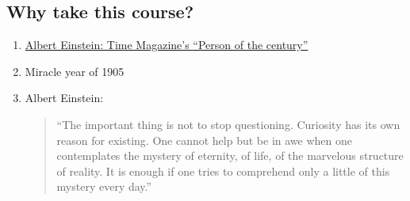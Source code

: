 \documentclass[pagesize,headsepline,10pt,parskip=half]{scrreprt}
\begin{document}
      \subsection{Why take this course?}
        \begin{enumerate}
          \item \href{http://content.time.com/time/magazine/article/0,9171,993017,00.html?iid=sr-link1}{Albert Einstein: Time Magazine’s “Person of the century”}
          \item Miracle year of 1905
          \item Albert Einstein:
            \begin{quote}
              “The important thing is not to stop questioning.
              Curiosity has its own reason for existing.
              One cannot help but be in awe when one contemplates the mystery of eternity,
              of life, of the marvelous structure of reality.
              It is enough if one tries to comprehend only a little of this mystery every day.”
            \end{quote}
        \end{enumerate}
\end{document}
